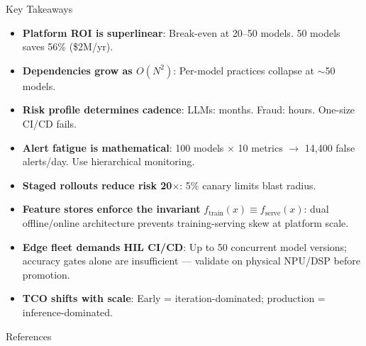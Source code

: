 \documentclass[aspectratio=169, 12pt]{beamer}
\begin{document}
\begin{frame}{Key Takeaways}

\scriptsize
\begin{itemize}\setlength\itemsep{0pt}
  \item \textbf{Platform ROI is superlinear}: Break-even at 20--50 models. 50 models saves 56\% (\$2M/yr).
  \item \textbf{Dependencies grow as $O(N^2)$}: Per-model practices collapse at $\sim$50 models.
  \item \textbf{Risk profile determines cadence}: LLMs: months. Fraud: hours. One-size CI/CD fails.
  \item \textbf{Alert fatigue is mathematical}: 100 models $\times$ 10 metrics $\to$ 14,400 false alerts/day. Use hierarchical monitoring.
  \item \textbf{Staged rollouts reduce risk 20$\times$}: 5\% canary limits blast radius.
  \item \textbf{Feature stores enforce the invariant} $f_{\text{train}}(x) \equiv f_{\text{serve}}(x)$: dual offline/online architecture prevents training-serving skew at platform scale.
  \item \textbf{Edge fleet demands HIL CI/CD}: Up to 50 concurrent model versions; accuracy gates alone are insufficient --- validate on physical NPU/DSP before promotion.
  \item \textbf{TCO shifts with scale}: Early = iteration-dominated; production = inference-dominated.
\end{itemize}

\end{frame}

\begin{frame}{References}

\small
{}

\end{frame}
\end{document}
